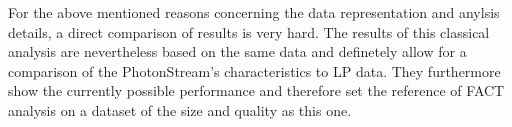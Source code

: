 For the above mentioned reasons concerning the data representation and anylsis
details, a direct comparison of results is very hard. The results of this
classical analysis are nevertheless based on the same data and definetely allow
for a comparison of the PhotonStream's characteristics to LP data. They
furthermore show the currently possible performance and therefore set the reference of FACT analysis on a dataset of the size and quality as this one.
